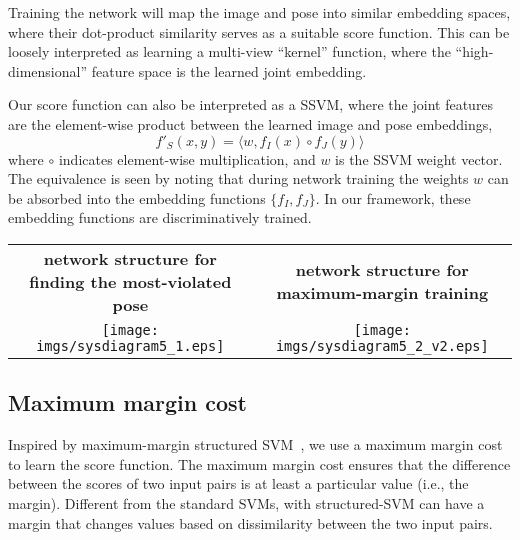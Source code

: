 \documentclass[10pt,twocolumn,letterpaper]{article}
\begin{document}
Training the network will map the image and pose into similar embedding spaces, where their dot-product similarity serves as a suitable score function. This can be loosely interpreted as learning a multi-view ``kernel'' function, where the ``high-dimensional'' feature space is the learned joint embedding.
%
%
%
%
%

%


Our score function can also be interpreted as a %
SSVM, where the joint features
are the element-wise product between the learned image and pose embeddings, 
\begin{equation}
  f'_{S}(x,y) = \langle w, f_{I}(x) \circ f_{J}(y) \rangle
\end{equation}
where $\circ$ indicates element-wise multiplication, and  $w$ is the SSVM weight vector.  
The equivalence is seen by noting that during network training the  weights $w$ can be absorbed into the embedding functions $\{f_I, f_J\}$.
In our framework, these embedding functions are discriminatively trained.
 

\begin{figure*}[t]
\begin{center}     
%
\begin{tabular}{c|c}{\footnotesize \bf network structure for finding the most-violated pose}
&
{\footnotesize \bf network structure for maximum-margin training}
\\
   \texttt{[image: imgs/sysdiagram5\_1.eps]}
   &
  \texttt{[image: imgs/sysdiagram5\_2\_v2.eps]}
\end{tabular} 
\end{center}  
\vspace{-0.15in}
   \caption{(left) Network structure for calculating the most violated pose.  For a given image, the score values are predicted for a set of candidate poses.  The re-scaling margin values are added, and the largest value is selected as the most-violated pose. Thick arrows represent an array of outputs, with each entry corresponding to one candidate pose.
 (right) Network structure for maximum-margin training. Given the most-violated pose, the margin cost and pose prediction cost are calculated, and the gradients are passed back through the network.}
\label{fig:trainnet}
\vspace{-0.15in}
\end{figure*}
 

%
\subsection{Maximum margin cost}
\vspace{-0.05in}
Inspired by maximum-margin structured SVM~\cite{ssvm2005}, we use a maximum margin cost to learn the score function.
The maximum margin cost ensures that the difference between the scores of two input pairs is at least a particular value (i.e., the margin). Different from the standard SVMs, with structured-SVM can have a margin that changes values based on dissimilarity between the two input pairs.
\end{document}
